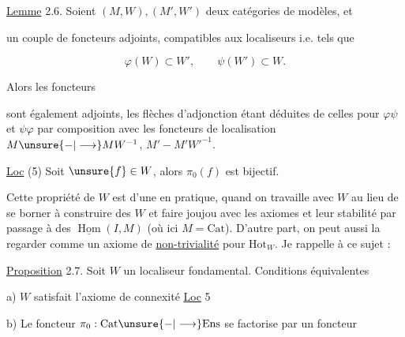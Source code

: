 
\uline{Lemme} 2.6. Soient $(M,W),(M',W')$ deux catégories de modèles, et


un couple de foncteurs adjoints, compatibles aux localiseurs i.e. tels que

\[
\varphi(W)\subset W',\qquad \psi(W')\subset W.
\]

Alors les foncteurs 


sont également adjoints, les flèches d'adjonction  étant déduites de celles pour $\varphi\psi$ et $\psi\varphi$ par composition avec les foncteurs de localisation $M\unsure{{-}|\longrightarrow}MW^{-1}$, $M'{-}M'W'^{-1}$.



\uline{Loc} (5)  Soit $\unsure{f}\in W$, alors $\pi_0(f)$ est bijectif.

Cette  propriété de $W$ est d'une   en pratique, quand on travaille avec $W$ au lieu de se borner à construire des $W$ et faire joujou avec les axiomes et leur stabilité par passage à des $\underline{\operatorname{Hom}}(I,M)$ (où ici $M=\mathrm{Cat}$). D'autre part, on peut aussi la regarder comme un axiome de \uline{non-trivialité} pour $\mathrm{Hot}_W$. Je rappelle à ce sujet : 

\uline{Proposition} 2.7. Soit $W$ un localiseur fondamental. Conditions équivalentes

a) $W$ satisfait l'axiome de connexité \uline{Loc} 5

b) Le foncteur $\pi_0:\mathrm{Cat}\unsure{{-}|\longrightarrow}\mathrm{Ens}$ se factorise par un foncteur


